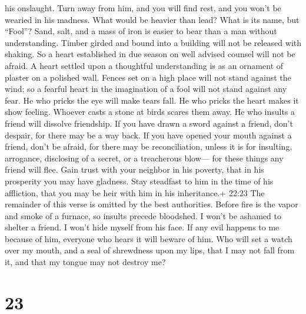 his onslaught. Turn away from him, and you will find rest, and you won't
be wearied in his madness.  What would be heavier than
lead? What is its name, but ``Fool''?  Sand, salt, and a
mass of iron is easier to bear than a man without understanding.
 Timber girded and bound into a building will not be
released with shaking. So a heart established in due season on well
advised counsel will not be afraid.  A heart settled upon a
thoughtful understanding is as an ornament of plaster on a polished
wall.  Fences set on a high place will not stand against
the wind; so a fearful heart in the imagination of a fool will not stand
against any fear.  He who pricks the eye will make tears
fall. He who pricks the heart makes it show feeling. 
Whoever casts a stone at birds scares them away. He who insults a friend
will dissolve friendship.  If you have drawn a sword
against a friend, don't despair, for there may be a way back.
 If you have opened your mouth against a friend, don't be
afraid, for there may be reconciliation, unless it is for insulting,
arrogance, disclosing of a secret, or a treacherous blow--- for these
things any friend will flee.  Gain trust with your neighbor
in his poverty, that in his prosperity you may have gladness. Stay
steadfast to him in the time of his affliction, that you may be heir
with him in his inheritance.+ 22:23 The remainder of this verse is
omitted by the best authorities.  Before fire is the vapor
and smoke of a furnace, so insults precede bloodshed.  I
won't be ashamed to shelter a friend. I won't hide myself from his face.
 If any evil happens to me because of him, everyone who
hears it will beware of him.  Who will set a watch over my
mouth, and a seal of shrewdness upon my lips, that I may not fall from
it, and that my tongue may not destroy me?

\hypertarget{section-5}{%
\section{23}\label{section-5}}

